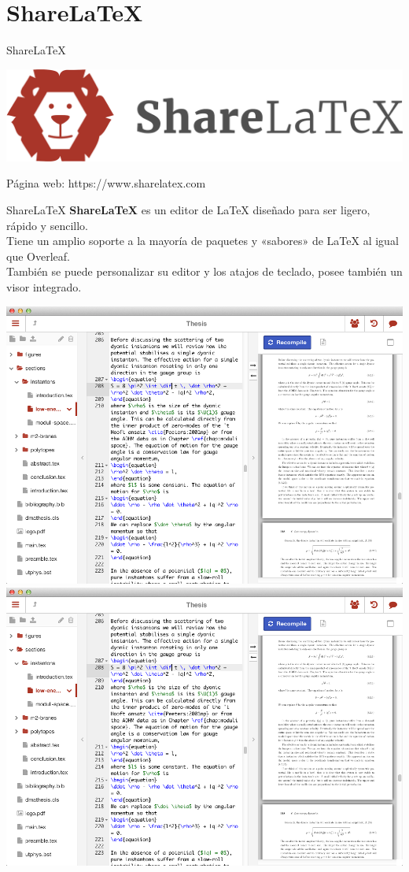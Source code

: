 \documentclass[12pt,aspectratio=43]{beamer}
\makeatletter
\newcommand{\lmr}{\fontfamily{lmr}\selectfont}
\newcommand{\ifratio}[2]{
	\ifthenelse
	{\lengthtest{\beamer@paperwidth=16cm} \AND \lengthtest{\beamer@paperheight=9cm}}
	{#1}
	{#2} }
\makeatother
\begin{document}
\section{ShareLaTeX}
\begin{frame}{ShareLaTeX}{}
\begin{center}
	\includegraphics[width=0.7\linewidth]{ShareLaTeX_Logo}
\end{center}

Página web: https://www.sharelatex.com
\end{frame}

\begin{frame}{ShareLaTeX}{}
\alert{\bf ShareLaTeX} es un editor de {\lmr\LaTeX} diseñado para ser ligero, rápido y sencillo.\pause\\[1em]

Tiene un amplio soporte a la mayoría de paquetes y «sabores» de {\lmr\LaTeX} al igual que Overleaf.\pause\\[1em]

También se puede personalizar su editor y los atajos de teclado, posee también un visor integrado.
\end{frame}

\begin{frame}[plain]{}{}
\centering
\ifratio
	{\includegraphics[width=0.8\linewidth]{ShareLaTeX_Screen}}
	{\includegraphics[width=\linewidth]{ShareLaTeX_Screen}}
\end{frame}
\end{document}
